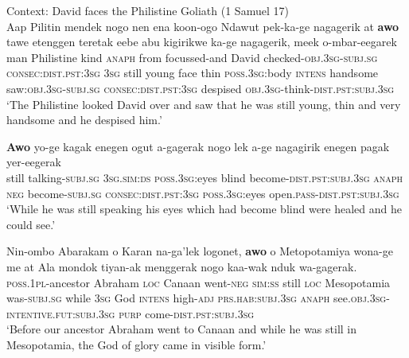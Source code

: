 \begin{exe}
	\ex \label{exAppendixWesternDani1} Context: David faces the Philistine Goliath (1 Samuel 17)\\
	\gll Aap Pilitin mendek nogo nen {ena koon}-ogo Ndawut pek-ka-ge nagagerik at \textbf{awo} tawe etenggen teretak eebe abu kigirikwe ka-ge nagagerik, meek o-mbar-eegarek\\
	man Philistine kind \textsc{anaph} from focussed-and David checked-\textsc{obj}.3\textsc{sg}-\textsc{subj.sg} \textsc{consec:dist.pst:}3\textsc{sg}  3\textsc{sg} still young face thin \textsc{poss}.3\textsc{sg}:body \textsc{intens} handsome saw:\textsc{obj}.3\textsc{sg}-\textsc{subj.sg} \textsc{consec:dist.pst:}3\textsc{sg} despised \textsc{obj}.3\textsc{sg}-think-\textsc{dist.pst}:\textsc{subj}.3\textsc{sg}\\
	\glt \lq The Philistine looked David over and saw that he was still young, thin and very handsome and he despised him.' \parencite[94]{Barclay2008}

	\ex \label{exAppendixWesternDani2}
	\gll \textbf{Awo} yo-ge kagak enegen ogut a-gagerak nogo lek a-ge nagagirik enegen {pagak yer}-eegerak\\
	still talking-\textsc{subj.sg} 3\textsc{sg}.\textsc{sim}:\textsc{ds} \textsc{poss}.3\textsc{sg}:eyes blind become-\textsc{dist.pst}:\textsc{subj}.3\textsc{sg} \textsc{anaph} \textsc{neg} become-\textsc{subj.sg} \textsc{consec:dist.pst:}3\textsc{sg} \textsc{poss}.3\textsc{sg}:eyes  open.\textsc{pass}-\textsc{dist.pst}:\textsc{subj}.3\textsc{sg}\\
	\glt \lq While he was still speaking his eyes which had become blind were healed and he could see.' \parencite[148]{Barclay2008}

	\ex \label{exAppendixWesternDani3}
	\gll Nin-ombo Abarakam o Karan na-ga'lek logonet, \textbf{awo} o Metopotamiya wona-ge me at Ala mondok tiyan-ak menggerak nogo kaa-wak nduk wa-gagerak.\\
\textsc{poss}.1\textsc{pl}-ancestor Abraham \textsc{loc} Canaan went-\textsc{neg} \textsc{sim}:\textsc{ss} still \textsc{loc} Mesopotamia was-\textsc{subj}.\textsc{sg} while 3\textsc{sg} God \textsc{intens} high-\textsc{adj} \textsc{prs.hab}:\textsc{subj}.3\textsc{sg} \textsc{anaph} see.\textsc{obj}.3\textsc{sg}-\textsc{intentive}.\textsc{fut}:\textsc{subj}.3\textsc{sg} \textsc{purp} come-\textsc{dist.pst}:\textsc{subj}.3\textsc{sg}\\
	\glt \lq Before our ancestor Abraham went to Canaan and while he was still in Mesopotamia, the God of glory came in visible form.' \parencite[619]{Barclay2008}
\end{exe}
\largerpage
